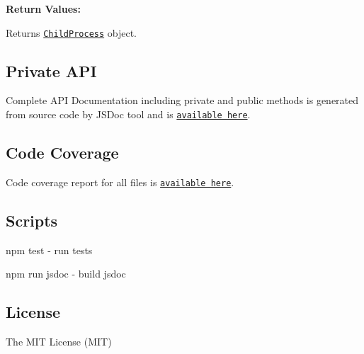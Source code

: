 {\bfseries Return Values\+:}

Returns \href{http://nodejs.org/api/child_process.html#child_process_class_childprocess}{\tt Child\+Process} object.

\subsection*{Private A\+PI}

Complete A\+PI Documentation including private and public methods is generated from source code by J\+S\+Doc tool and is \href{https://s3.eu-central-1.amazonaws.com/tsertkov-artifacts/exec-sh/master/jsdoc/index.html}{\tt available here}.

\subsection*{Code Coverage}

Code coverage report for all files is \href{https://s3.eu-central-1.amazonaws.com/tsertkov-artifacts/exec-sh/master/coverage/lcov-report/index.html}{\tt available here}.

\subsection*{Scripts}


\begin{DoxyItemize}
\item {\ttfamily npm test} -\/ run tests
\item {\ttfamily npm run jsdoc} -\/ build jsdoc
\end{DoxyItemize}

\subsection*{License}

The M\+IT License (M\+IT) 